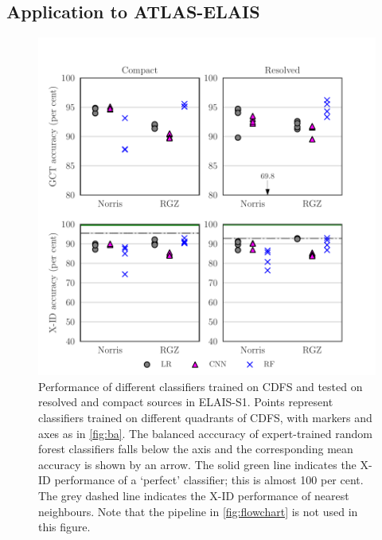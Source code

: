 \documentclass[fleqn,usenatbib,usedcolumn]{mnras}
\begin{document}
\subsection{Application to ATLAS-ELAIS}
  \label{sec:elais}

  \begin{figure}
  \centering
  \includegraphics[width=\columnwidth]{images/elais-grid-new.pdf}
  \caption{Performance of different classifiers trained on CDFS and tested on resolved and compact sources in ELAIS-S1. Points represent classifiers trained on different quadrants of CDFS, with markers and axes as in \autoref{fig:ba}. The balanced acccuracy of expert-trained random forest classifiers falls below the axis and the corresponding mean accuracy is shown by an arrow. The solid green line indicates the X-ID performance of a `perfect' classifier; this is almost 100 per cent. The grey dashed line indicates the X-ID performance of nearest neighbours. Note that the pipeline in \autoref{fig:flowchart} is not used in this figure.
    \label{fig:elais-ba}}
  \end{figure}
\end{document}
